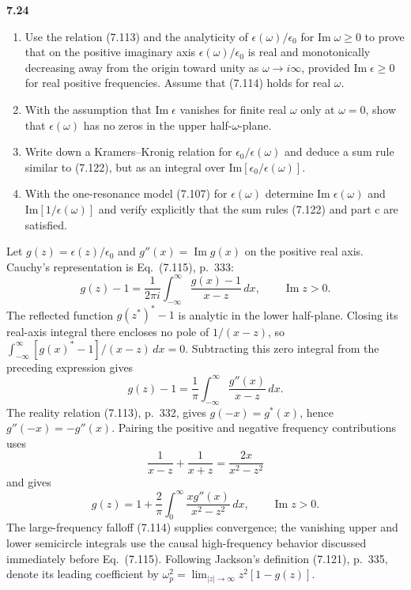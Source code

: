 \par\bigskip
\noindent\textbf{7.24}\quad\begin{enumerate}
\item[(a)] Use the relation (7.113) and the analyticity of $\epsilon(\omega)/\epsilon_{0}$ for $\mathrm{Im}\;\omega\geq0$ to prove that on the positive imaginary axis $\epsilon(\omega)/\epsilon_{0}$ is real and monotonically decreasing away from the origin toward unity as $\omega\to i\infty$, provided $\mathrm{Im}\;\epsilon\geq0$ for real positive frequencies. Assume that (7.114) holds for real $\omega$.
\item[(b)] With the assumption that $\mathrm{Im}\;\epsilon$ vanishes for finite real $\omega$ only at $\omega=0$, show that $\epsilon(\omega)$ has no zeros in the upper half-$\omega$-plane.
\item[(c)] Write down a Kramers--Kronig relation for $\epsilon_{0}/\epsilon(\omega)$ and deduce a sum rule similar to (7.122), but as an integral over $\mathrm{Im}[\epsilon_{0}/\epsilon(\omega)]$.
\item[(d)] With the one-resonance model (7.107) for $\epsilon(\omega)$ determine $\mathrm{Im}\;\epsilon(\omega)$ and $\mathrm{Im}[1/\epsilon(\omega)]$ and verify explicitly that the sum rules (7.122) and part c are satisfied.
\end{enumerate}
\solution
Let $g(z)=\epsilon(z)/\epsilon_0$ and
$g''(x)=\operatorname{Im}g(x)$ on the positive real axis. Cauchy's representation is Eq.~(7.115), p.~333:
\[
g(z)-1=\frac1{2\pi i}\int_{-\infty}^{\infty}
\frac{g(x)-1}{x-z}\,dx,\qquad \operatorname{Im}z>0.
\]
The reflected function $g(z^*)^*-1$ is analytic in the lower
half-plane. Closing its real-axis integral there encloses no pole
of $1/(x-z)$, so
$\int_{-\infty}^{\infty}[g(x)^*-1]/(x-z)\,dx=0$.
Subtracting this zero integral from the preceding expression gives
\[
g(z)-1=\frac1\pi\int_{-\infty}^{\infty}\frac{g''(x)}{x-z}\,dx.
\]
The reality relation (7.113), p.~332, gives
$g(-x)=g^*(x)$, hence $g''(-x)=-g''(x)$. Pairing the positive and
negative frequency contributions uses
\[
\frac1{x-z}+\frac1{x+z}=\frac{2x}{x^2-z^2}
\]
and gives
\[
g(z)=1+\frac2\pi\int_0^\infty
\frac{xg''(x)}{x^2-z^2}\,dx,\qquad\operatorname{Im}z>0.
\tag{*}
\]
The large-frequency falloff (7.114) supplies convergence; the
vanishing upper and lower semicircle integrals use the causal
high-frequency behavior discussed immediately before Eq.~(7.115).
Following Jackson's definition (7.121), p.~335, denote its leading
coefficient by $\omega_p^2=\lim_{|z|\to\infty}z^2[1-g(z)]$.
